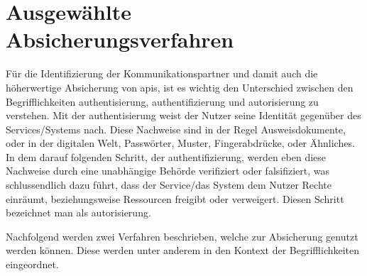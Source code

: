 \section{Ausgewählte Absicherungsverfahren}\label{sec:ausgewählte-absicherungsverfahren}

	Für die Identifizierung der Kommunikationspartner
	und damit auch die höherwertige Absicherung von \glspl{api},
	ist es wichtig den Unterschied zwischen den Begrifflichkeiten \gls{authentisierung},
	 \gls{authentifizierung} und \gls{autorisierung} zu verstehen.
	Mit der \gls{authentisierung} weist der Nutzer seine Identität gegenüber des Services/Systems nach.
	Diese Nachweise sind in der Regel Ausweisdokumente,
	oder in der digitalen Welt,
	Passwörter, Muster, Fingerabdrücke, oder Ähnliches.
	In dem darauf folgenden Schritt, der \gls{authentifizierung},
	werden eben diese Nachweise durch eine unabhängige Behörde verifiziert oder falsifiziert,
	was schlussendlich dazu führt,
	dass der Service/das System dem Nutzer Rechte einräumt,
	beziehungsweise Ressourcen freigibt oder verweigert.
	Diesen Schritt bezeichnet man als \gls{autorisierung}.

	Nachfolgend werden zwei Verfahren beschrieben,
	welche zur Absicherung genutzt werden können.
	Diese werden unter anderem in den Kontext der Begrifflichkeiten eingeordnet.

	
	